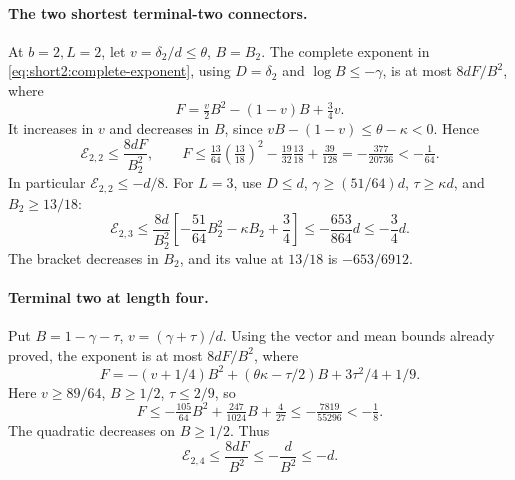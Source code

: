 \paragraph{The two shortest terminal-two connectors.}
At \(b=2,L=2\), let \(v=\delta_2/d\le\theta\), \(B=B_2\).
The complete exponent in \eqref{eq:short2:complete-exponent},
using \(D=\delta_2\) and \(\log B\le-\gamma\), is at most
\(8dF/B^2\), where
\[
 F=\tfrac v2 B^2-(1-v)B+\tfrac34v .
\]
It increases in \(v\) and decreases in \(B\), since
\(vB-(1-v)\le\theta-\kappa<0\). Hence
\begin{equation}\label{eq:short2:L2-paid}
 \mathcal E_{2,2}\le\frac{8dF}{B_2^2},\qquad
 F\le\tfrac{13}{64}(\tfrac{13}{18})^2
       -\tfrac{19}{32}\tfrac{13}{18}+\tfrac{39}{128}
   =-\tfrac{377}{20736}<-\tfrac1{64}.
\end{equation}
In particular \(\mathcal E_{2,2}\le-d/8\).
For \(L=3\), use \(D\le d\), \(\gamma\ge(51/64)d\),
\(\tau\ge\kappa d\), and \(B_2\ge13/18\):
\begin{equation}\tag{Q71.5.2}\label{eq:ordinary-short2-L3-paid}
 \mathcal E_{2,3}\le
 \frac{8d}{B_2^2}\left[-\frac{51}{64}B_2^2-\kappa B_2+\frac34\right]
 \le-\frac{653}{864}d\le-\frac34d .
\end{equation}
The bracket decreases in \(B_2\), and its value at \(13/18\)
is \(-653/6912\).

\paragraph{Terminal two at length four.}
Put \(B=1-\gamma-\tau\), \(v=(\gamma+\tau)/d\).
Using the vector and mean bounds already proved, the exponent
is at most \(8dF/B^2\), where
\[
 F=-(v+1/4)B^2+(\theta\kappa-\tau/2)B+3\tau^2/4+1/9 .
\]
Here \(v\ge89/64\), \(B\ge1/2\), \(\tau\le2/9\), so
\[
 F\le-\tfrac{105}{64}B^2+\tfrac{247}{1024}B+\tfrac4{27}
 \le-\tfrac{7819}{55296}<-\tfrac18 .
\]
The quadratic decreases on \(B\ge1/2\). Thus
\begin{equation}\label{eq:ordinary-short2-L4-paid}
 \mathcal E_{2,4}\le\frac{8dF}{B^2}\le-\frac d{B^2}\le-d .
\end{equation}

